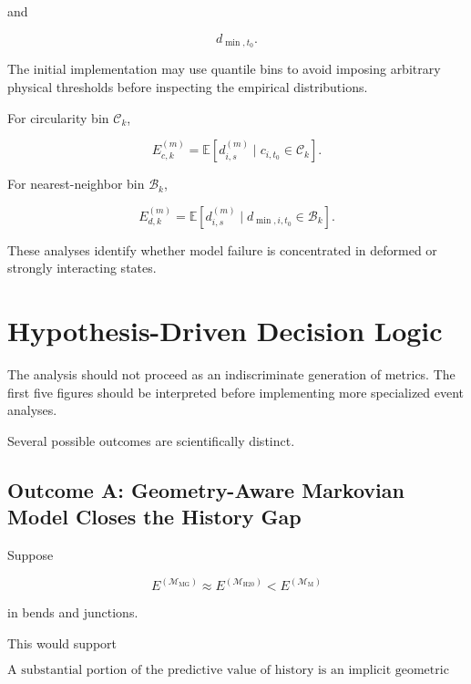 \documentclass[11pt]{article}
\newcommand{\Mhist}{\mathcal{M}_{\mathrm{H20}}}
\newcommand{\Mmark}{\mathcal{M}_{\mathrm{M}}}
\newcommand{\Mgeom}{\mathcal{M}_{\mathrm{MG}}}
\begin{document}
and

\begin{equation}
d_{\min,t_0}.
\end{equation}

The initial implementation may use quantile bins to avoid imposing arbitrary physical thresholds before inspecting the empirical distributions.

For circularity bin \(\mathcal{C}_k\),

\begin{equation}
E_{c,k}^{(m)}
=
\mathbb{E}
\left[
d_{i,s}^{(m)}
\mid
c_{i,t_0}\in\mathcal{C}_k
\right].
\end{equation}

For nearest-neighbor bin \(\mathcal{B}_k\),

\begin{equation}
E_{d,k}^{(m)}
=
\mathbb{E}
\left[
d_{i,s}^{(m)}
\mid
d_{\min,i,t_0}\in\mathcal{B}_k
\right].
\end{equation}

These analyses identify whether model failure is concentrated in deformed or strongly interacting states.

\section{Hypothesis-Driven Decision Logic}

The analysis should not proceed as an indiscriminate generation of metrics. The first five figures should be interpreted before implementing more specialized event analyses.

Several possible outcomes are scientifically distinct.

\subsection{Outcome A: Geometry-Aware Markovian Model Closes the History Gap}

Suppose

\begin{equation}
E^{(\Mgeom)}
\approx
E^{(\Mhist)}
<
E^{(\Mmark)}
\end{equation}

in bends and junctions.

This would support

\begin{equation}
\boxed{
\text{A substantial portion of the predictive value of history is an implicit geometric prior.}
}
\end{equation}
\end{document}
